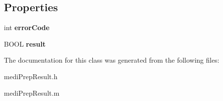 \subsection*{Properties}
\begin{DoxyCompactItemize}
\item 
\hypertarget{interfacemedi_prep_result_a3860e4a52dc23e69015910be672dc3e6}{}int {\bfseries error\+Code}\label{interfacemedi_prep_result_a3860e4a52dc23e69015910be672dc3e6}

\item 
\hypertarget{interfacemedi_prep_result_a75629affafdc84503203d73116fc274e}{}B\+O\+O\+L {\bfseries result}\label{interfacemedi_prep_result_a75629affafdc84503203d73116fc274e}

\end{DoxyCompactItemize}


The documentation for this class was generated from the following files\+:\begin{DoxyCompactItemize}
\item 
medi\+Prep\+Result.\+h\item 
medi\+Prep\+Result.\+m\end{DoxyCompactItemize}
